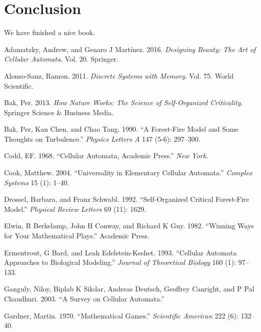 \documentclass[
]{book}
\newlength{\cslhangindent}
\newenvironment{cslreferences}%
  {\setlength{\parindent}{0pt}%
  \everypar{\setlength{\hangindent}{\cslhangindent}}\ignorespaces}%
  {\par}
\begin{document}
\hypertarget{conclusion}{%
\chapter{Conclusion}\label{conclusion}}

We have finished a nice book.

\hypertarget{refs}{}
\begin{cslreferences}
\leavevmode\hypertarget{ref-adamatzky2016designing}{}%
Adamatzky, Andrew, and Genaro J Martínez. 2016. \emph{Designing Beauty: The Art of Cellular Automata}. Vol. 20. Springer.

\leavevmode\hypertarget{ref-alonso2011discrete}{}%
Alonso-Sanz, Ramon. 2011. \emph{Discrete Systems with Memory}. Vol. 75. World Scientific.

\leavevmode\hypertarget{ref-bak2013nature}{}%
Bak, Per. 2013. \emph{How Nature Works: The Science of Self-Organized Criticality}. Springer Science \& Business Media.

\leavevmode\hypertarget{ref-bak1990forest}{}%
Bak, Per, Kan Chen, and Chao Tang. 1990. ``A Forest-Fire Model and Some Thoughts on Turbulence.'' \emph{Physics Letters A} 147 (5-6): 297--300.

\leavevmode\hypertarget{ref-codd1968cellular}{}%
Codd, EF. 1968. ``Cellular Automata, Academic Press.'' \emph{New York}.

\leavevmode\hypertarget{ref-cook2004universality}{}%
Cook, Matthew. 2004. ``Universality in Elementary Cellular Automata.'' \emph{Complex Systems} 15 (1): 1--40.

\leavevmode\hypertarget{ref-drossel1992self}{}%
Drossel, Barbara, and Franz Schwabl. 1992. ``Self-Organized Critical Forest-Fire Model.'' \emph{Physical Review Letters} 69 (11): 1629.

\leavevmode\hypertarget{ref-elwin1982winning}{}%
Elwin, R Berkelamp, John H Conway, and Richard K Guy. 1982. ``Winning Ways for Your Mathematical Plays.'' Academic Press.

\leavevmode\hypertarget{ref-ermentrout1993cellular}{}%
Ermentrout, G Bard, and Leah Edelstein-Keshet. 1993. ``Cellular Automata Approaches to Biological Modeling.'' \emph{Journal of Theoretical Biology} 160 (1): 97--133.

\leavevmode\hypertarget{ref-ganguly2003survey}{}%
Ganguly, Niloy, Biplab K Sikdar, Andreas Deutsch, Geoffrey Canright, and P Pal Chaudhuri. 2003. ``A Survey on Cellular Automata.''

\leavevmode\hypertarget{ref-gardner1970mathematical}{}%
Gardner, Martin. 1970. ``Mathematical Games.'' \emph{Scientific American} 222 (6): 132--40.


\end{cslreferences}
\end{document}
